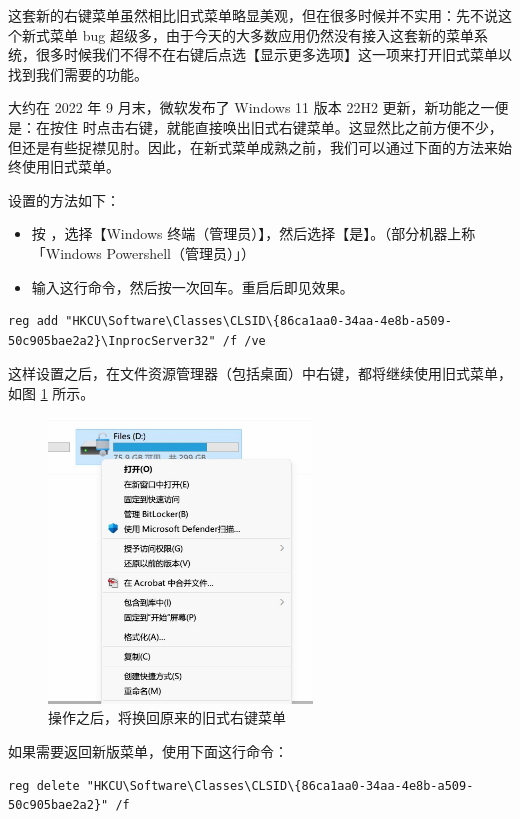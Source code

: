 这套新的右键菜单虽然相比旧式菜单略显美观，但在很多时候并不实用：先不说这个新式菜单 bug 超级多，由于今天的大多数应用仍然没有接入这套新的菜单系统，很多时候我们不得不在右键后点选【显示更多选项】这一项来打开旧式菜单以找到我们需要的功能。

大约在 2022 年 9 月末，微软发布了 Windows 11 版本 22H2 更新，新功能之一便是：在按住  时点击右键，就能直接唤出旧式右键菜单。这显然比之前方便不少，但还是有些捉襟见肘。因此，在新式菜单成熟之前，我们可以通过下面的方法来始终使用旧式菜单。

设置的方法如下：

\begin{itemize}
  \item 按 ，选择【Windows 终端（管理员）】，然后选择【是】。（部分机器上称「Windows Powershell（管理员）」）
  \item 输入这行命令，然后按一次回车。重启后即见效果。
\end{itemize}

\begin{Verbatim}[fontsize=\footnotesize]
  reg add "HKCU\Software\Classes\CLSID\{86ca1aa0-34aa-4e8b-a509-50c905bae2a2}\InprocServer32" /f /ve
\end{Verbatim}

这样设置之后，在文件资源管理器（包括桌面）中右键，都将继续使用旧式菜单，如图 \ref{Old_menu} 所示。

\begin{figure}[htb!]
  \centering
  \includegraphics[width=7cm]{assets/Old_menu.jpg}
  \caption{操作之后，将换回原来的旧式右键菜单}
  \label{Old_menu}
\end{figure}

如果需要返回新版菜单，使用下面这行命令：

\begin{Verbatim}[fontsize=\small]
  reg delete "HKCU\Software\Classes\CLSID\{86ca1aa0-34aa-4e8b-a509-50c905bae2a2}" /f
\end{Verbatim}
